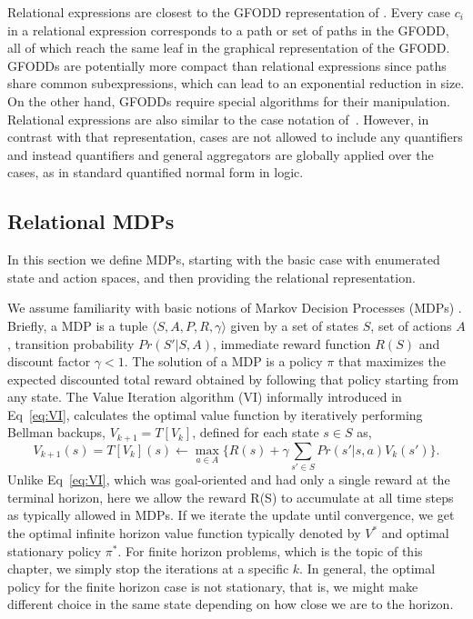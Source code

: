 Relational expressions are closest to the GFODD representation of
\cite{JoshiKeKh11,JoshiKhRaTaFe13}.  Every case $c_i$ in a relational expression corresponds to a path or set of paths in the GFODD, all of which reach the same leaf in the graphical representation
of the GFODD.  GFODDs are potentially more compact than relational expressions since paths share common subexpressions, which can lead to an exponential reduction in size. On the other hand, GFODDs require special algorithms for their manipulation.
Relational expressions are also similar to the
%
case notation
of~\cite{BoutilierRePr01,SannerBo09}. However, in contrast with that representation, cases are not allowed to include any quantifiers and instead quantifiers and general aggregators are globally applied over the cases, as in standard quantified normal form in logic.




\subsection{Relational MDPs}

%
%
%
%
%
%
%
%
%
%
%
%
%
%
%
%

In this section we define MDPs, starting 
with the basic case with enumerated state and action spaces,
and then providing the relational representation.

We assume familiarity with basic notions of Markov Decision Processes
(MDPs) \cite{RussellNo09,Puterman1994}.  Briefly,
a MDP is a tuple $\langle S,A,P,R,\gamma \rangle$ given by a set of
states $S$, set of actions $A$, transition probability $Pr(S'|S,A)$, immediate
reward function $R(S)$
and discount factor $\gamma<1$.  The solution of a MDP is a policy
$\pi$
%
%
that maximizes the expected discounted total reward
obtained by following that policy starting from any state.  The Value
Iteration algorithm (VI) informally introduced in Eq~\ref{eq:VI}, calculates the
optimal value function by iteratively performing Bellman backups,
$V_{k+1} = T[V_k]$, defined for each state $s \in S$ as,
%
%
\begin{equation}
\label{eq:viflat}
V_{k+1}(s) = T[V_k](s) \leftarrow \max_{a \in A} \{ R(s) + \gamma \sum_{s' \in S} Pr(s'|s,a) V_k(s')\}.
\end{equation}
Unlike Eq~\ref{eq:VI}, which was goal-oriented and had only a single
reward at the terminal horizon, here we allow the reward R(S) to accumulate
at all time steps as typically allowed in MDPs.  
If we iterate the update until convergence, we get the
optimal infinite horizon value function typically denoted by $V^*$ and optimal stationary policy $\pi^*$.
For finite horizon problems, which is the topic of this chapter, we simply stop the iterations at a
specific $k$. 
In general, the optimal policy for the finite horizon case is not stationary, that is, we might make different choice in the same state depending on how close we are to the horizon. 

